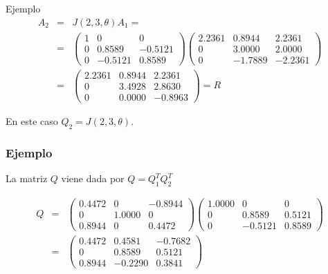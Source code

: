 \documentclass{beamer}
\begin{document}
\begin{frame}{Ejemplo}
    \begin{eqnarray}
      \nonumber A_2 & = & J(2,3,\theta)A_1 = \\
      \nonumber & = &\left(\begin{array}{ccc}
                    1 & 0 & 0\\
                      0 & 0.8589 & -0.5121\\
                      0 & -0.5121 & 0.8589
                    \end{array}\right)\left(\begin{array}{ccc}
                      2.2361 &   0.8944  &  2.2361\\
                          0  &  3.0000 &   2.0000\\
                          0  & -1.7889 &  -2.2361
                  \end{array}\right)\\
      \nonumber & = &\left(\begin{array}{ccc}
              2.2361 &   0.8944 & 2.2361\\
        0  &  3.4928  &  2.8630\\
        0  &  0.0000 &  -0.8963
              \end{array}\right) = R
      \end{eqnarray}
      
      En este caso $Q_2=J(2,3,\theta)$.      
\end{frame}
\begin{frame}
  \frametitle{Ejemplo}
  La matriz $Q$ viene dada por $Q=Q_1^TQ_2^T$
      
  \begin{eqnarray}
  \nonumber Q &=& \left(\begin{array}{ccc}
               0.4472  & 0 &  -0.8944\\
               0 & 1.0000 &       0\\
              0.8944 & 0 &   0.4472
            \end{array}\right)\left(\begin{array}{ccc} 
    1.0000 &  0 & 0\\
           0  &  0.8589 & 0.5121\\
           0  & -0.5121 & 0.8589
  \end{array}\right)\\
  \nonumber &=& \left(\begin{array}{ccc}
  0.4472  &  0.4581 &  -0.7682\\
           0 &   0.8589 &   0.5121\\
      0.8944 &  -0.2290 &   0.3841
  \end{array}\right)
  \end{eqnarray}   
\end{frame}   
\end{document}
